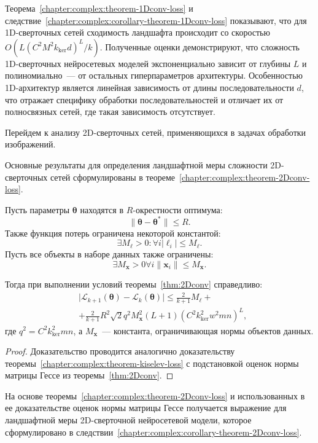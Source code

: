 Теорема~\ref{chapter:complex:theorem-1Dconv-loss} и следствие~\ref{chapter:complex:corollary-theorem-1Dconv-loss} показывают, что для 1D-сверточных сетей сходимость ландшафта происходит со скоростью $O(L(C^2M^2k_{\mathrm{ker}}d)^{L}/k)$. Полученные оценки демонстрируют, что сложность 1D-сверточных нейросетевых моделей экспоненциально зависит от глубины $L$ и полиномиально~--- от остальных гиперпараметров архитектуры.
Особенностью 1D-архитектур является линейная зависимость от длины последовательности $d$, что отражает специфику обработки последовательностей и отличает их от полносвязных сетей, где такая зависимость отсутствует.

Перейдем к анализу 2D-сверточных сетей, применяющихся в задачах обработки изображений.

Основные результаты для определения ландшафтной меры сложности 2D-сверточных сетей сформулированы в теореме~\ref{chapter:complex:theorem-2Dconv-loss}.

\begin{theorem}\label{chapter:complex:theorem-2Dconv-loss}
Пусть параметры $\boldsymbol{\theta}$ находятся в $R$-окрестности оптимума:
\[
    \|\boldsymbol{\theta} - \boldsymbol{\theta}^*\| \leqslant R.
\]
Также функция потерь ограничена некоторой константой:
\[
    \exists  M_{\ell} > 0:  \forall i |\ell_i| \leqslant M_{\ell}.
\]
Пусть все объекты в наборе данных также ограничены:
\[
    \exists M_{\mathbf{x}} > 0 \forall i  \|\mathbf{x}_i\| \leqslant M_{\mathbf{x}}.
\]

Тогда при выполнении условий теоремы~\ref{thm:2Dconv} справедливо:
\begin{align}
    & \big|\mathcal{L}_{k+1}(\boldsymbol{\theta}) - \mathcal{L}_{k}(\boldsymbol{\theta})\big| \leqslant \frac{2}{k+1}M_{\ell} +\\
    & + \frac{2}{k+1}R^2\sqrt{2}q^2M_{\mathbf{x}}^2(L+1)(C^2k_{\mathrm{ker}}^2w^2mn)^L,
\end{align}
где $q^2 = C^2k_{\mathrm{ker}}^2mn$, а $M_{\mathbf{x}}$~--- константа, ограничивающая нормы объектов данных.
\end{theorem}
\begin{proof}
    Доказательство проводится аналогично доказательству теоремы~\ref{chapter:complex:theorem-kiselev-loss} с подстановкой оценок нормы матрицы Гессе из теоремы~\ref{thm:2Dconv}.
\end{proof}

На основе теоремы~\ref{chapter:complex:theorem-2Dconv-loss} и использованных в ее доказательстве оценок нормы матрицы Гессе получается выражение для ландшафтной меры 2D-сверточной нейросетевой модели, которое сформулировано в следствии~\ref{chapter:complex:corollary-theorem-2Dconv-loss}.

